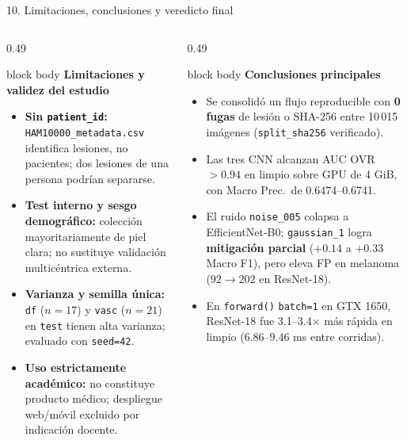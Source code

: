 \documentclass[aspectratio=169,10pt,xcolor=table]{beamer}
\begin{document}
\begin{frame}{10. Limitaciones, conclusiones y veredicto final}
  \begin{columns}[T,onlytextwidth]
    \begin{column}{0.49\textwidth}
      \begin{beamercolorbox}[wd=\linewidth,sep=6pt]{block body}
        {\footnotesize\bfseries\color{azulInst}Limitaciones y validez del estudio}
        \vspace{3pt}
        \scriptsize
        \begin{itemize}\setlength{\itemsep}{3pt}
          \item \textbf{Sin \texttt{patient\_id}:} \texttt{HAM10000\_metadata.csv} identifica lesiones, no pacientes; dos lesiones de una persona podrían separarse.
          \item \textbf{Test interno y sesgo demográfico:} colección mayoritariamente de piel clara; no sustituye validación multicéntrica externa.
          \item \textbf{Varianza y semilla única:} \texttt{df} ($n=17$) y \texttt{vasc} ($n=21$) en \texttt{test} tienen alta varianza; evaluado con \texttt{seed=42}.
          \item \textbf{Uso estrictamente académico:} no constituye producto médico; despliegue web/móvil excluido por indicación docente.
        \end{itemize}
      \end{beamercolorbox}
    \end{column}
    \begin{column}{0.49\textwidth}
      \begin{beamercolorbox}[wd=\linewidth,sep=6pt]{block body}
        {\footnotesize\bfseries\color{azulInst}Conclusiones principales}
        \vspace{3pt}
        \scriptsize
        \begin{itemize}\setlength{\itemsep}{3pt}
          \item Se consolidó un flujo reproducible con \textbf{0 fugas} de lesión o SHA-256 entre 10\,015 imágenes (\texttt{split\_sha256} verificado).
          \item Las tres CNN alcanzan AUC OVR $>0.94$ en limpio sobre GPU de 4 GiB, con Macro Prec.\ de 0.6474--0.6741.
          \item El ruido \texttt{noise\_005} colapsa a EfficientNet-B0; \texttt{gaussian\_1} logra \textbf{mitigación parcial} ($+0.14$ a $+0.33$ Macro F1), pero eleva FP en melanoma ($92 \to 202$ en ResNet-18).
          \item En \texttt{forward()} \texttt{batch=1} en GTX 1650, ResNet-18 fue 3.1--3.4$\times$ más rápida en limpio (6.86--9.46 ms entre corridas).
        \end{itemize}
      \end{beamercolorbox}
    \end{column}
  \end{columns}


\end{frame}
\end{document}
